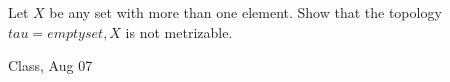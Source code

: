 \begin{samepage}
\begin{ex}
Let $X$ be any set with more than one element. 
Show that the topology $tau = {{ empty set, X }}$ is not metrizable.
\end{ex}
\begin{source}
Class, Aug 07
\end{source}
\end{samepage}
